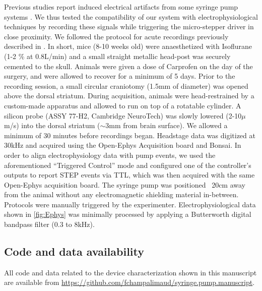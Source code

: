 Previous studies report induced electrical artifacts from some syringe pump systems \citep{Amarante2019}. We thus tested the compatibility of our system with electrophysiological techniques by recording these signals while triggering the micro-stepper driver in close proximity.
We followed the protocol for acute recordings previously described in \cite{Cruz2022}. In short, mice (8-10 weeks old) were anaesthetized with Isoflurane (1-2 \% at 0.8L/min) and a small straight metallic head-post was securely cemented to the skull. Animals were given a dose of Carprofen on the day of the surgery, and were allowed to recover for a minimum of 5 days. Prior to the recording session, a small circular craniotomy (1.5mm of diameter) was opened above the dorsal striatum. During acquisition, animals were head-restrained by a custom-made apparatus and allowed to run on top of a rotatable cylinder. A silicon probe (ASSY 77-H2, Cambridge NeuroTech) was slowly lowered (2-10$\mu$m/s) into the dorsal striatum ($\sim$3mm from brain surface). We allowed a minimum of 30 minutes before recordings began. Headstage data was digitized at 30kHz and acquired using the Open-Ephys Acquisition board and Bonsai. In order to align electrophysiology data with pump events, we used the aforementioned “Triggered Control” mode and configured one of the controller’s outputs to report STEP events via TTL, which was then acquired with the same Open-Ephys acquisition board. The syringe pump was positioned ~20cm away from the animal without any electromagnetic shielding material in-between. Protocols were manually triggered by the experimenter.
Electrophysiological data shown in \cref{fig:Ephys} was minimally processed by applying a Butterworth digital bandpass filter (0.3 to 8kHz).

\subsection{Code and data availability}
All code and data related to the device characterization shown in this manuscript are available from \url{https://github.com/fchampalimaud/syringe.pump.manuscript}.


